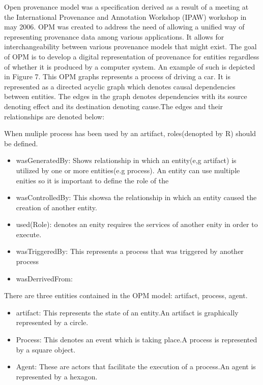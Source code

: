 Open provenance model was a specification derived as a result of a meeting at the International Provenance and Annotation Workshop (IPAW) workshop in may 2006. OPM was created to address the need of allowing a unified way of representing provenance data among various applications. It allows for interchangeability between various provenance models that might exist. The goal of OPM is to develop a digital representation of provenance for entities regardless of whether it is produced by a computer system. An example of such is depicted in Figure 7. This OPM graphs represents a process of driving a car. It is represented as a directed acyclic graph which denotes causal dependencies between entities. The edges in the graph denotes dependencies with its source denoting effect and its destination denoting cause.The edges and their relationships are denoted below: 

When muliple process has been used by an artifact, roles(denopted by R) should be defined.

\begin{itemize}
\item wasGeneratedBy: Shows relationship in which an entity(e,g artifact) is utilized by one or  more entities(e.g process). An entity can use multiple enities so it is important to define the role of the  
\item wasControlledBy: This showsa the relationship in which an entity caused the creation of another entity.
\item used(Role): denotes an enity requires the services of another enity in order to execute.
\item wasTriggeredBy: This represents a process that was triggered by another process
\item wasDerrivedFrom:
\end{itemize}

 There are three entities contained in the OPM model: artifact, process, agent. 

\begin{itemize}
\item
artifact: This represents the state of an entity.An artifact is graphically represented by a circle.

\item
Process: This denotes an event which is taking place.A process is represented by a square object.

\item 
Agent: These are actors that facilitate the execution of a process.An agent is represented by a hexagon.
\end{itemize}

